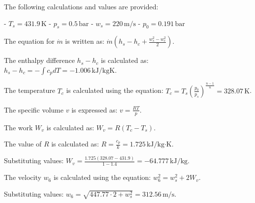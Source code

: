 The following calculations and values are provided:  

- \( T_s = 431.9 \, \text{K} \)  
- \( p_s = 0.5 \, \text{bar} \)  
- \( w_s = 220 \, \text{m/s} \)  
- \( p_0 = 0.191 \, \text{bar} \)  

The equation for \( \dot{m} \) is written as:  
\( \dot{m} (h_s - h_c + \frac{w_s^2 - w_c^2}{2}) \).  

The enthalpy difference \( h_s - h_c \) is calculated as:  
\( h_s - h_c = - \int c_p dT = -1.006 \, \text{kJ/kgK} \).  

The temperature \( T_c \) is calculated using the equation:  
\( T_c = T_s \left( \frac{p_0}{p_s} \right)^{\frac{n-1}{n}} = 328.07 \, \text{K} \).  

The specific volume \( v \) is expressed as:  
\( v = \frac{RT}{p} \).  

The work \( W_v \) is calculated as:  
\( W_v = R (T_c - T_s) \).  

The value of \( R \) is calculated as:  
\( R = \frac{c_p}{k} = 1.725 \, \text{kJ/kg·K} \).  

Substituting values:  
\( W_v = \frac{1.725 (328.07 - 431.9)}{1 - 1.4} = -64.777 \, \text{kJ/kg} \).  

The velocity \( w_6 \) is calculated using the equation:  
\( w_6^2 = w_s^2 + 2W_v \).  

Substituting values:  
\( w_6 = \sqrt{447.77 \cdot 2 + w_s^2} = 312.56 \, \text{m/s} \).